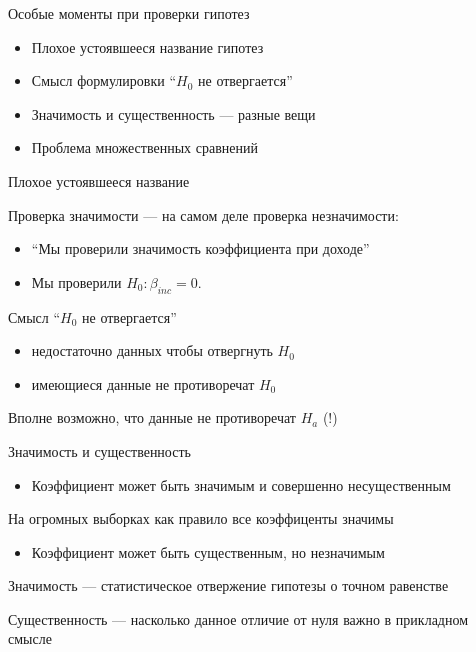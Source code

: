 \documentclass[russian,ignorenonframetext,]{beamer}
\providecommand{\tightlist}{%
  \setlength{\itemsep}{0pt}\setlength{\parskip}{0pt}}
\begin{document}
\begin{frame}{Особые моменты при проверки гипотез}

\begin{itemize}
\item
  Плохое устоявшееся название гипотез
\item
  Смысл формулировки ``\(H_0\) не отвергается''
\item
  Значимость и существенность --- разные вещи
\item
  Проблема множественных сравнений
\end{itemize}

\end{frame}

\begin{frame}{Плохое устоявшееся название}

Проверка значимости --- на самом деле проверка незначимости:

\begin{itemize}
\item
  ``Мы проверили значимость коэффициента при доходе''
\item
  Мы проверили \(H_0: \beta_{inc}=0\).
\end{itemize}

\end{frame}

\begin{frame}{Смысл ``\(H_0\) не отвергается''}

\begin{itemize}
\item
  недостаточно данных чтобы отвергнуть \(H_0\)
\item
  имеющиеся данные не противоречат \(H_0\)
\end{itemize}

Вполне возможно, что данные не противоречат \(H_a\) (!)

\end{frame}

\begin{frame}{Значимость и существенность}

\begin{itemize}
\tightlist
\item
  Коэффициент может быть значимым и совершенно несущественным
\end{itemize}

На огромных выборках как правило все коэффиценты значимы

\begin{itemize}
\tightlist
\item
  Коэффициент может быть существенным, но незначимым
\end{itemize}

Значимость --- статистическое отвержение гипотезы о точном равенстве

Существенность --- насколько данное отличие от нуля важно в прикладном
смысле

\end{frame}
\end{document}
